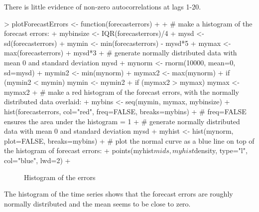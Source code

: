 \documentclass[11pt, a4paper]{article} %
\begin{document}
\begin{Schunk}
\end{Schunk}
There is little evidence of non-zero autocorrelations at lags 1-20.

\begin{Schunk}
\begin{Sinput}
> plotForecastErrors <- function(forecasterrors)
+   {
+      # make a histogram of the forecast errors:
+      mybinsize <- IQR(forecasterrors)/4
+      mysd   <- sd(forecasterrors)
+      mymin  <- min(forecasterrors) - mysd*5
+      mymax  <- max(forecasterrors) + mysd*3
+      # generate normally distributed data with mean 0 and standard deviation mysd
+      mynorm <- rnorm(10000, mean=0, sd=mysd)
+      mymin2 <- min(mynorm)
+      mymax2 <- max(mynorm)
+      if (mymin2 < mymin) { mymin <- mymin2 }
+      if (mymax2 > mymax) { mymax <- mymax2 }
+      # make a red histogram of the forecast errors, with the normally distributed data overlaid:
+      mybins <- seq(mymin, mymax, mybinsize)
+      hist(forecasterrors, col="red", freq=FALSE, breaks=mybins)
+      # freq=FALSE ensures the area under the histogram = 1
+      # generate normally distributed data with mean 0 and standard deviation mysd
+      myhist <- hist(mynorm, plot=FALSE, breaks=mybins)
+      # plot the normal curve as a blue line on top of the histogram of forecast errors:
+      points(myhist$mids, myhist$density, type="l", col="blue", lwd=2)
+   }
\end{Sinput}
\end{Schunk}


\begin{figure}
\centering
\begin{Schunk}
\end{Schunk}
\caption{Histogram of the errors}
\end{figure}

The histogram of the time series shows that the forecast errors are roughly normally distributed and the mean seems to be close to zero. 
\end{document}
